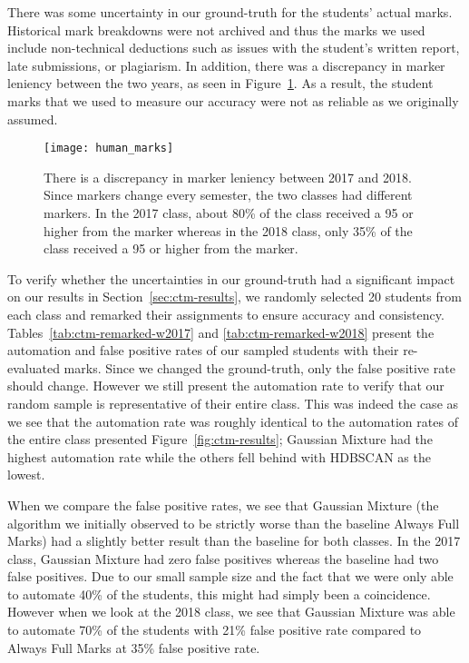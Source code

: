 There was some uncertainty in our ground-truth for the students' actual marks. Historical mark breakdowns were not archived and thus the marks we used include non-technical deductions such as issues with the student's written report, late submissions, or plagiarism. In addition, there was a discrepancy in marker leniency between the two years, as seen in Figure~\ref{fig:ctm-marker-discrepancy}. As a result, the  student marks that we used to measure our accuracy were not as reliable as we originally assumed.

\begin{figure}
\texttt{[image: human\_marks]}
\caption[Marker Discrepancy Between 2017 and 2018]{There is a discrepancy in marker leniency between 2017 and 2018. Since markers change every semester, the two classes had different markers. In the 2017 class, about 80\% of the class received a 95 or higher from the marker whereas in the 2018 class, only 35\% of the class received a 95 or higher from the marker.}
\label{fig:ctm-marker-discrepancy}
\end{figure}

To verify whether the uncertainties in our ground-truth had a significant impact on our results in Section~\ref{sec:ctm-results}, we randomly selected 20 students from each class and remarked their assignments to ensure accuracy and consistency. Tables~\ref{tab:ctm-remarked-w2017} and \ref{tab:ctm-remarked-w2018} present the automation and false positive rates of our sampled students with their re-evaluated marks. Since we changed the ground-truth, only the false positive rate should change. However we still present the automation rate to verify that our random sample is representative of their entire class. This was indeed the case as we see that the automation rate was roughly identical to the automation rates of the entire class presented Figure~\ref{fig:ctm-results}; Gaussian Mixture had the highest automation rate while the others fell behind with HDBSCAN as the lowest.

When we compare the false positive rates, we see that Gaussian Mixture (the algorithm we initially observed to be strictly worse than the  baseline Always Full Marks) had a slightly better result than the baseline for both classes. In the 2017 class, Gaussian Mixture had zero false positives whereas the baseline had two false positives. Due to our small sample size and the fact that we were only able to automate 40\% of the students, this might had simply been a coincidence. However when we look at the 2018 class, we see that Gaussian Mixture was able to automate 70\% of the students with 21\% false positive rate compared to Always Full Marks at 35\% false positive rate.

